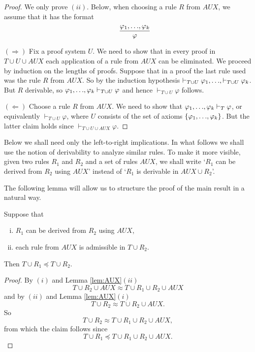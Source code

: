 \documentclass[runningheads]{llncs}       %
\newcommand{\AUX}{\mathit{AUX}}
\begin{document}
\begin{proof}
  We only prove $(ii)$.
Below, when choosing a rule $R$ from $\AUX$, we assume that it has the format
\[ 
 \qquad \frac{\varphi_1,\mbox{$\ldots$},\varphi_k}{\varphi}
\]

\III

\NI
$(\Rightarrow)$ Fix a proof system $U$.  We need to show that in every
proof in $T \cup U \cup \AUX$ each application of a rule from $\AUX$
can be eliminated.  We proceed by induction on the lengths of
proofs. Suppose that in a proof the last rule used was the rule $R$ from $\AUX$.
So by the induction hypothesis
$ \vdash_{T \cup U} \varphi_1, \mbox{$\ldots$}, \vdash_{T \cup U} \varphi_k$.  But $R$
derivable, so 
$\varphi_1, \mbox{$\ldots$}, \varphi_k \vdash_{T \cup U} \varphi$ and hence
$\vdash_{T \cup U} \varphi$ follows.

\III

\NI
$(\Leftarrow)$ Choose a rule $R$ from $\AUX$.
We need to show that
$\varphi_1, \mbox{$\ldots$}, \varphi_k \vdash_T \varphi$, or equivalently
$\vdash_{T \cup U} \varphi$, where $U$ consists of the set of axioms
$\mbox{$\{{\varphi_1,\mbox{$\ldots$},\varphi_k}\}$}$.  But the latter claim holds since
$\vdash_{T \cup U \cup \AUX} \varphi$.
\HB
\end{proof}

Below we shall need only the left-to-right implications.  In what
follows we shall use the notion of derivability to analyze similar
rules. To make it more visible, given two rules $R_1$ and $R_2$ and a
set of rules $\AUX$, we shall write `$R_1$ can be derived from $R_2$
using $\AUX$' instead of `$R_1$ is derivable in $\AUX \cup R_2$'.

The following lemma will allow us to structure the proof of the main result
in a natural way.

\begin{lemma} \label{lem:equ}
  Suppose that
  \begin{enumerate}[(i)]
  \item $R_1$ can be derived from $R_2$ using $\AUX$,
    
  \item each rule from $\AUX$ is admissible in $T \cup R_2$.    
  \end{enumerate}

  Then $T \cup R_1 \preceq T \cup R_2$.
\end{lemma}

\begin{proof}
  By $(i)$ and Lemma \ref{lem:AUX}$(ii)$
\[
T \cup R_2 \cup \AUX \approx T \cup R_1 \cup R_2 \cup \AUX
\]
and by $(ii)$ and Lemma \ref{lem:AUX}$(i)$
\[
T \cup R_2 \approx T \cup R_2 \cup \AUX.
\]
So 
\[
T \cup R_2 \approx T \cup R_1 \cup R_2 \cup \AUX,
\]
from which the claim follows since
\[
  T \cup R_1 \preceq T \cup R_1 \cup R_2 \cup \AUX.
\]
\HB  
\end{proof}
\end{document}
